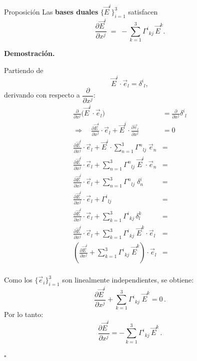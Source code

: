 \documentclass[../apunte_mecanica_clasica.tex]{subfiles}%
\begin{document}
\begin{apuntebloque}{Proposición}
Las \textbf{bases duales} $\{\vec{E}^i\}_{i=1}^3$ satisfacen
\begin{equation*}
    \frac{\partial \vec{E}^i}{\partial x^j}
    \;=\;
    - \sum_{k=1}^3 \Gamma^i{}_{kj}\, \vec{E}^k .
\end{equation*}

\textbf{Demostración.} 

Partiendo de
\begin{equation*}
    \vec{E}^i \cdot \vec{e}_l = \delta^i{}_l,
\end{equation*}
derivando con respecto a $\dfrac{\partial}{\partial x^j}$:
\begin{align*}
    \frac{\partial}{\partial x^j}\big(\vec{E}^i \cdot \vec{e}_l\big) 
    &= \frac{\partial}{\partial x^j}\delta^i{}_l \\
    \Rightarrow\quad\frac{\partial \vec{E}^i}{\partial x^j} \cdot \vec{e}_l 
       + \vec{E}^i \cdot \frac{\partial \vec{e}_l}{\partial x^j}
    &= 0 \\
    \frac{\partial \vec{E}^i}{\partial x^j} \cdot \vec{e}_l 
       + \vec{E}^i \cdot \sum_{n=1}^3\Gamma^n{}_{lj}\;\vec{e}_n
    &=  \\
    \frac{\partial \vec{E}^i}{\partial x^j} \cdot \vec{e}_l 
       +  \sum_{n=1}^3\Gamma^n{}_{lj}\;\vec{E}^i \cdot\vec{e}_n
    &= \\
    \frac{\partial \vec{E}^i}{\partial x^j} \cdot \vec{e}_l 
       +  \sum_{n=1}^3\Gamma^n{}_{lj}\;\delta^i_n
    &= \\
    \frac{\partial \vec{E}^i}{\partial x^j} \cdot \vec{e}_l 
       +  \Gamma^i{}_{lj}
    &= \\
    \frac{\partial \vec{E}^i}{\partial x^j} \cdot \vec{e}_l 
       +  \sum_{k=1}^3\Gamma^i{}_{kj}\, \delta^k_l
    &= \\
    \frac{\partial \vec{E}^i}{\partial x^j} \cdot \vec{e}_l 
       +  \sum_{k=1}^3\Gamma^i{}_{kj}\;\vec{E}^k \cdot\vec{e}_l
    &= \\
    \left( \frac{\partial \vec{E}^i}{\partial x^j} 
       +  \sum_{k=1}^3\Gamma^i{}_{kj}\;\vec{E}^k \right) \cdot\vec{e}_l
    &= \\
\end{align*}

Como los $\{\vec{e}_i\}_{i=1}^3$ son linealmente independientes, se obtiene:
\begin{equation*}
    \frac{\partial \vec{E}^i}{\partial x^j} 
       +  \sum_{k=1}^3\Gamma^i{}_{kj}\;\vec{E}^k=0\,.
\end{equation*}
Por lo tanto:
\begin{equation*}
\frac{\partial \vec{E}^i}{\partial x^j}
    = - \sum_{k=1}^3 \Gamma^i{}_{kj} \, \vec{E}^k \,.
\end{equation*}

\hfill $\square$
\end{apuntebloque}
\end{document}

